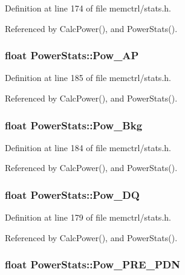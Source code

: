 Definition at line 174 of file memctrl/stats.h.

Referenced by CalcPower(), and PowerStats().
\subsubsection[{Pow\_\-AP}]{\setlength{\rightskip}{0pt plus 5cm}float {\bf PowerStats::Pow\_\-AP}}\label{classPowerStats_240666efca9caaa4cb03254f67a8e73f}




Definition at line 185 of file memctrl/stats.h.

Referenced by CalcPower(), and PowerStats().
\subsubsection[{Pow\_\-Bkg}]{\setlength{\rightskip}{0pt plus 5cm}float {\bf PowerStats::Pow\_\-Bkg}}\label{classPowerStats_e972073d4e91b7e2547d7a97e2ec211a}




Definition at line 184 of file memctrl/stats.h.

Referenced by CalcPower(), and PowerStats().
\subsubsection[{Pow\_\-DQ}]{\setlength{\rightskip}{0pt plus 5cm}float {\bf PowerStats::Pow\_\-DQ}}\label{classPowerStats_f9ee7072b2408a81b284703f9a79611a}




Definition at line 179 of file memctrl/stats.h.

Referenced by CalcPower(), and PowerStats().
\subsubsection[{Pow\_\-PRE\_\-PDN}]{\setlength{\rightskip}{0pt plus 5cm}float {\bf PowerStats::Pow\_\-PRE\_\-PDN}}\label{classPowerStats_d8fc8ee5489223928600f7317822d6ed}




